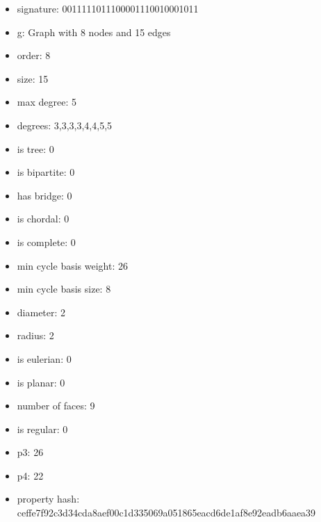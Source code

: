 \begin{itemize}
\item signature: 0011111011100001110010001011
\item g: Graph with 8 nodes and 15 edges
\item order: 8
\item size: 15
\item max degree: 5
\item degrees: 3,3,3,3,4,4,5,5
\item is tree: 0
\item is bipartite: 0
\item has bridge: 0
\item is chordal: 0
\item is complete: 0
\item min cycle basis weight: 26
\item min cycle basis size: 8
\item diameter: 2
\item radius: 2
\item is eulerian: 0
\item is planar: 0
\item number of faces: 9
\item is regular: 0
\item p3: 26
\item p4: 22
\item property hash: ceffe7f92c3d34cda8aef00c1d335069a051865eacd6de1af8e92eadb6aaea39
\end{itemize}
\newpage
\begin{figure}
\end{figure}
